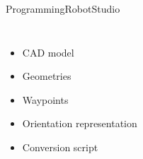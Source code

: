 \begin{frame}{Programming}{RobotStudio}
\begin{columns}
\begin{itemize}
    \item CAD model
    \item Geometries
    \item Waypoints
    \item Orientation representation
    \item Conversion script
\end{itemize}

\end{columns}
\end{frame}